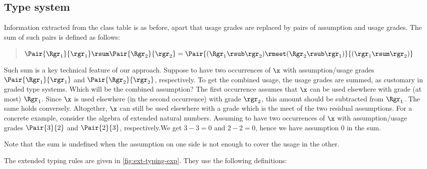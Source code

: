 \subsection{Type system}

Information extracted from the class table is as before, apart that usage grades are replaced by pairs of assumption and usage grades. The sum of such pairs is defined as follows:

\begin{quote}
$\Pair{\Rgr_1}{\rgr_1}\rsum\Pair{\Rgr_2}{\rgr_2}=\Pair{(\Rgr_1 \rsub \rgr_2) \rmeet (\Rgr_2 \rsub \rgr_1)}{(\rgr_1\rsum\rgr_2)}$
\end{quote}

Such sum is a key technical feature of our approach. Suppose to have two occurrences of $\x$ with assumption/usage grades $\Pair{\Rgr_1}{\rgr_1}$ and $\Pair{\Rgr_2}{\rgr_2}$, respectively.
To get the combined usage, the usage grades are summed, as customary in graded type systems. Which will be the combined assumption?
The first occurrence assumes that $\x$ can be used elsewhere with grade (at most) $\Rgr_1$.  Since $\x$ is used elsewhere (in the second occurrence) with grade $\rgr_2$, this amount should be subtracted from $\Rgr_1$. The same holds conversely. Altogether, $\x$ can still be used elsewhere with a grade which is the meet of the two residual assumptions. 
For a concrete example, consider the algebra of extended natural numbers. Assuming to have two occurrences of $\x$ with assumption/usage grades $\Pair{3}{2}$ and $\Pair{2}{3}$, respectively.We get $3-3=0$ and $2-2=0$, hence we have assumption $0$ in the sum.  %

Note that the sum is undefined when the assumption on one side is not enough to cover the usage in the other.

The extended typing rules are given in \cref{fig:ext-typing-exp}. They use the following definitions:

